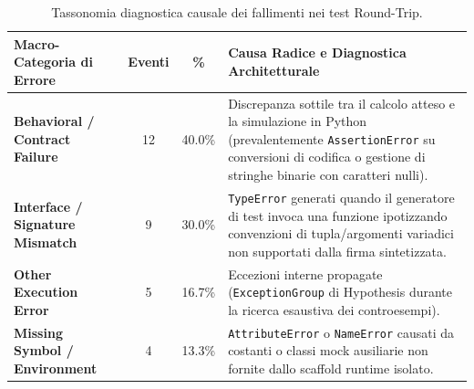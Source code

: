 \begin{table}[htbp]
\centering
\caption{Tassonomia diagnostica causale dei fallimenti nei test Round-Trip.}
\label{tab:error_breakdown}
\begin{tabularx}{\textwidth}{lccX}
\toprule
\textbf{Macro-Categoria di Errore} & \textbf{Eventi} & \textbf{\%} & \textbf{Causa Radice e Diagnostica Architetturale} \\
\midrule
\textbf{Behavioral / Contract Failure} & 12 & 40.0\% & Discrepanza sottile tra il calcolo atteso e la simulazione in Python (prevalentemente \texttt{AssertionError} su conversioni di codifica o gestione di stringhe binarie con caratteri nulli). \\
\textbf{Interface / Signature Mismatch} & 9 & 30.0\% & \texttt{TypeError} generati quando il generatore di test invoca una funzione ipotizzando convenzioni di tupla/argomenti variadici non supportati dalla firma sintetizzata. \\
\textbf{Other Execution Error} & 5 & 16.7\% & Eccezioni interne propagate (\texttt{ExceptionGroup} di Hypothesis durante la ricerca esaustiva dei controesempi). \\
\textbf{Missing Symbol / Environment} & 4 & 13.3\% & \texttt{AttributeError} o \texttt{NameError} causati da costanti o classi mock ausiliarie non fornite dallo scaffold runtime isolato. \\
\bottomrule
\end{tabularx}
\end{table}

